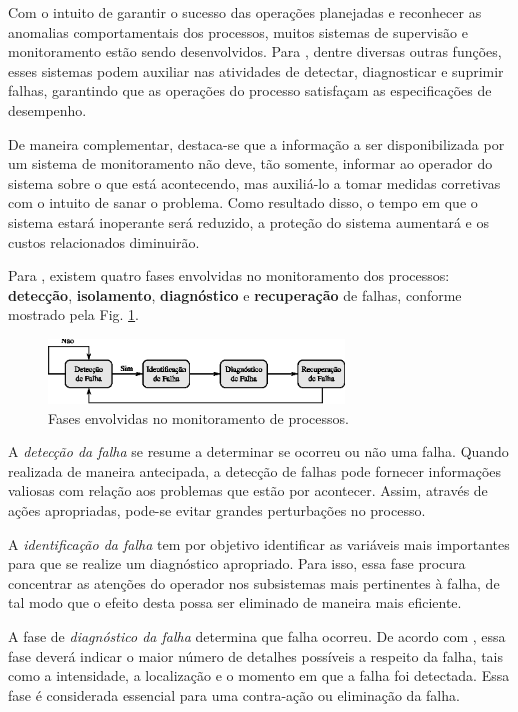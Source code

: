 Com o intuito de garantir o sucesso das operações planejadas e reconhecer as
anomalias comportamentais dos processos, muitos sistemas de supervisão e
monitoramento estão sendo desenvolvidos. Para ,
dentre diversas outras funções, esses sistemas podem auxiliar nas atividades de
detectar, diagnosticar e suprimir falhas, garantindo que as operações do
processo satisfaçam as especificações de desempenho.

De maneira complementar, destaca-se que a informação a ser disponibilizada por
um sistema de monitoramento não deve, tão somente, informar ao operador do
sistema sobre o que está acontecendo, mas auxiliá-lo a tomar medidas corretivas
com o intuito de sanar o problema. Como resultado disso, o tempo em que o
sistema estará inoperante será reduzido, a proteção do sistema aumentará e os
custos relacionados diminuirão.

Para , existem quatro fases envolvidas no monitoramento
dos processos: {\bf detecção}, {\bf isolamento}, {\bf diagnóstico} e {\bf
recuperação} de falhas, conforme mostrado pela Fig.
\ref{fig:fases_monitoramento}.

\begin{figure}[htb]
\centering
    \includegraphics[width=0.7\textwidth]
                    {imgs/detec_diag/eps/fases_monitoramento}
    \caption{Fases envolvidas no monitoramento de processos.}
    \label{fig:fases_monitoramento}
\end{figure}

A {\it detecção da falha} se resume a determinar se ocorreu ou não uma falha.
Quando realizada de maneira antecipada, a detecção de falhas pode fornecer
informações valiosas com relação aos problemas que estão por acontecer.  Assim,
através de ações apropriadas, pode-se evitar grandes perturbações no processo.

A {\it identificação da falha} tem por objetivo identificar as variáveis mais
importantes para que se realize um diagnóstico apropriado. Para isso, essa fase
procura concentrar as atenções do operador nos subsistemas mais pertinentes à
falha, de tal modo que o efeito desta possa ser eliminado de maneira mais
eficiente.

A fase de {\it diagnóstico da falha} determina que falha ocorreu. De acordo com
, essa fase deverá indicar o maior número de detalhes
possíveis a respeito da falha, tais como a intensidade, a localização e o
momento em que a falha foi detectada. Essa fase é considerada essencial para uma
contra-ação ou eliminação da falha.


